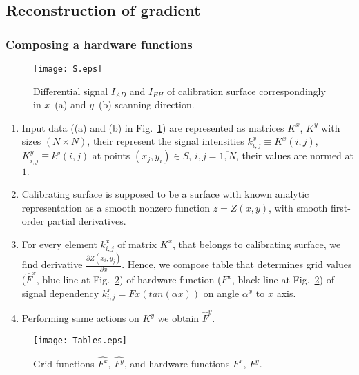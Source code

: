 \documentclass{beamer}
\begin{document}
\subsection{Reconstruction of gradient}
\begin{frame}[c,allowframebreaks]
    \frametitle{Composing a hardware functions}

    \begin{figure}[hp]
        \texttt{[image: S.eps]}
        \caption{\small Differential signal $I_{AD}$ and $I_{EH}$ of calibration surface
            correspondingly in $x$~(a) and $y$~(b) scanning direction.}
        {\label{fig:inputSphere}}%
    \end{figure}

    \framebreak

    \begin{enumerate}
        \item Input data ((a) and (b) in Fig.~\ref{fig:inputSphere}) are represented as matrices
            $K^x$, $K^y$ with sizes $(N \times N)$, their represent the signal intensities
            $k^x_{i,j} \equiv K^x (i,j)$, $K^y_{i,j} \equiv k^y (i,j)$ at points $(x_j, y_i) \in S$,
            $i,j = \overline{1,N}$, their values are normed at $1$.

        \item Calibrating surface is supposed to be a surface with known analytic representation as
            a smooth nonzero function $z = Z (x, y)$, with smooth first-order partial derivatives.

        \item For every element $k^x_{i,j}$ of matrix $K^x$, that belongs to calibrating surface, we
            find derivative $\frac{\partial Z(x_i, y_j)}{\partial x}$. Hence, we compose table that
            determines grid values ($\hat{F}^x$, blue line at Fig.~\ref{fig:Tables}) of hardware
            function ($F^x$, black line at Fig.~\ref{fig:Tables}) of signal dependency $k^x_{i,j} =
            Fx(tan(\alpha x))$ on angle $\alpha^x$ to $x$ axis.

        \item Performing same actions on $K^y$ we obtain $\hat{F}^y$.

    \end{enumerate}

    \framebreak

    \begin{figure}
        \texttt{[image: Tables.eps]}
        \caption{Grid functions $\hat{F^x}$, $\hat{F^y}$, and hardware functions $F^x$, $F^y$.}
        {\label{fig:Tables}}%
    \end{figure}

\end{frame}
\end{document}
